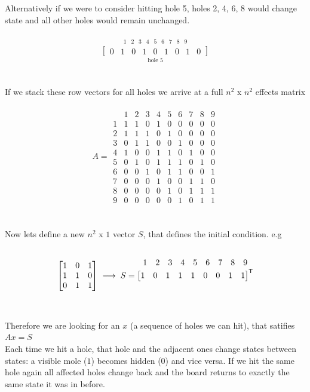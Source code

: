 \documentclass[11pt,a4paper]{article}
\begin{document}
Alternatively if we were to consider hitting hole 5, holes 2, 4, 6, 8 would change state and all other holes would remain unchanged.\\\\
\[
\overset{\begin{matrix}
1 & 2 & 3 & 4 & 5 & 6 & 7 & 8 & 9
\end{matrix}}
{\underset{\text{hole }5}{
\begin{bmatrix}
0 & 1 & 0 & 1 & 0 & 1 & 0 & 1 & 0
\end{bmatrix}
}}
\]
\\\\
If we stack these row vectors for all holes we arrive at a full $n^2$ x $n^2$ effects matrix\\\\
\[
A =
\begin{array}{c|ccccccccc}
  & 1 & 2 & 3 & 4 & 5 & 6 & 7 & 8 & 9 \\ \hline
1 & 1 & 1 & 0 & 1 & 0 & 0 & 0 & 0 & 0 \\
2 & 1 & 1 & 1 & 0 & 1 & 0 & 0 & 0 & 0 \\
3 & 0 & 1 & 1 & 0 & 0 & 1 & 0 & 0 & 0 \\
4 & 1 & 0 & 0 & 1 & 1 & 0 & 1 & 0 & 0 \\
5 & 0 & 1 & 0 & 1 & 1 & 1 & 0 & 1 & 0 \\
6 & 0 & 0 & 1 & 0 & 1 & 1 & 0 & 0 & 1 \\
7 & 0 & 0 & 0 & 1 & 0 & 0 & 1 & 1 & 0 \\
8 & 0 & 0 & 0 & 0 & 1 & 0 & 1 & 1 & 1 \\
9 & 0 & 0 & 0 & 0 & 0 & 1 & 0 & 1 & 1
\end{array}
\]
\\\\
Now lets define a new $n^2$ x $1$ vector $S$, that defines the initial condition.
e.g
\\\\
\[
\begin{bmatrix}
1 & 0 & 1 \\
1 & 1 & 0 \\
0 & 1 & 1
\end{bmatrix}
\;\longrightarrow\;
S =
{
\overset{\mathclap{\begin{matrix}
1 & 2 & 3 & 4 & 5 & 6 & 7 & 8 & 9
\end{matrix}}}{
\begin{bmatrix}
1 & 0 & 1 & 1 & 1 & 0 & 0 & 1 & 1
\end{bmatrix}
^{\mathsf T}}
}
\]
\\\\
Therefore we are looking for an $x$ (a sequence of holes we can hit), that satifies $Ax=S$\\
Each time we hit a hole, that hole and the adjacent ones change states between states:
a visible mole ($1$) becomes hidden ($0$) and vice versa.
If we hit the same hole again all affected holes change back
and the board returns to exactly the same state it was in before.
\end{document}
